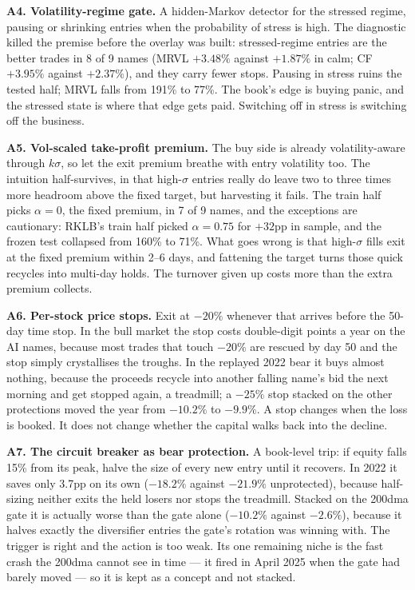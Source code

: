 \documentclass[11pt,a4paper]{article}
\begin{document}
\textbf{A4. Volatility-regime gate.} A hidden-Markov detector for the
stressed regime, pausing or shrinking entries when the probability of stress
is high. The diagnostic killed the premise before the overlay was built:
stressed-regime entries are the better trades in 8 of 9 names (MRVL
$+3.48\%$ against $+1.87\%$ in calm; CF $+3.95\%$ against $+2.37\%$), and
they carry fewer stops. Pausing in stress ruins the tested half; MRVL falls
from 191\% to 77\%. The book's edge is buying panic, and the stressed state
is where that edge gets paid. Switching off in stress is switching off the
business.

\textbf{A5. Vol-scaled take-profit premium.} The buy side is already
volatility-aware through $k\sigma$, so let the exit premium breathe with
entry volatility too. The intuition half-survives, in that high-$\sigma$
entries really do leave two to three times more headroom above the fixed
target, but harvesting it fails. The train half picks $\alpha=0$, the fixed
premium, in 7 of 9 names, and the exceptions are cautionary: RKLB's train
half picked $\alpha=0.75$ for $+32$pp in sample, and the frozen test
collapsed from 160\% to 71\%. What goes wrong is that high-$\sigma$ fills
exit at the fixed premium within 2--6 days, and fattening the target turns
those quick recycles into multi-day holds. The turnover given up costs more
than the extra premium collects.

\textbf{A6. Per-stock price stops.} Exit at $-20\%$ whenever that arrives
before the 50-day time stop. In the bull market the stop costs double-digit
points a year on the AI names, because most trades that touch $-20\%$ are
rescued by day 50 and the stop simply crystallises the troughs. In the
replayed 2022 bear it buys almost nothing, because the proceeds recycle into
another falling name's bid the next morning and get stopped again, a
treadmill; a $-25\%$ stop stacked on the other protections moved the year
from $-10.2\%$ to $-9.9\%$. A stop changes when the loss is booked. It does
not change whether the capital walks back into the decline.

\textbf{A7. The circuit breaker as bear protection.} A book-level trip: if
equity falls 15\% from its peak, halve the size of every new entry until it
recovers. In 2022 it saves only 3.7pp on its own ($-18.2\%$ against
$-21.9\%$ unprotected), because half-sizing neither exits the held losers
nor stops the treadmill. Stacked on the 200dma gate it is actually worse
than the gate alone ($-10.2\%$ against $-2.6\%$), because it halves exactly
the diversifier entries the gate's rotation was winning with. The trigger is
right and the action is too weak. Its one remaining niche is the fast crash
the 200dma cannot see in time --- it fired in April 2025 when the gate had
barely moved --- so it is kept as a concept and not stacked.
\end{document}
